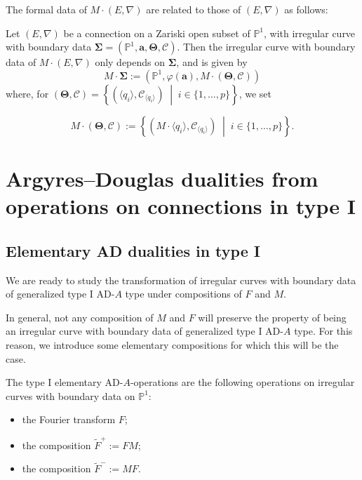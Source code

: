 \documentclass[11pt,a4paper]{amsart}
\numberwithin{equation}{section}
\newcommand{\cir}[1]{\langle #1 \rangle}
\begin{document}
The formal data of $M\cdot (E,\nabla)$ are related to those of $(E,\nabla)$ as follows:

\begin{lemma}
Let $(E,\nabla)$ be a connection on a Zariski open subset of $\mathbb P^1$, with irregular curve with boundary data $\bm\Sigma=(\mathbb P^1, \mathbf a, \bm\Theta, \bm{\mathcal C})$. 
Then the irregular curve with boundary data of $M\cdot (E,\nabla)$ only depends on $\bm\Sigma$, and is given by
\[
M\cdot \bm\Sigma:=(\mathbb P^1, \varphi(\mathbf a), M\cdot(\bm\Theta, \bm{\mathcal C}))
\]
where, for $(\bm\Theta, \bm{\mathcal C})=\left\lbrace \left(\cir{q_i}, \mathcal C_{\cir{q_i}}\right)\;\middle\vert\; i\in \{1, \dots, p\}\right\rbrace$, we set

\[
M\cdot(\bm\Theta, \bm{\mathcal C}):=\left\lbrace\left(M\cdot\cir{q_i}, \mathcal C_{\cir{q_i}}\right)\;\middle\vert\; i\in \{1, \dots, p\}\right\rbrace.
\]
\end{lemma}




\section{Argyres--Douglas dualities from operations on connections in type I}
\label{sec:type_I_dualities}

\subsection{Elementary AD dualities in type I}

We are ready to study the transformation of irregular curves with boundary data of generalized type I AD-$A$ type under compositions of $F$ and $M$. 

In general, not any composition of $M$ and $F$ will preserve the property of being an irregular curve with boundary data of generalized type I AD-$A$ type. For this reason, we introduce some elementary compositions for which this will be the case.

\begin{definition}
The type I elementary AD-$A$-operations are the following operations on irregular curves with boundary data on $\mathbb P^1$:
\begin{itemize}
\item the Fourier transform $F$;
\item the composition $\widetilde F^+:=FM$;
\item the composition $\widetilde F^{-}:=MF$.
\end{itemize}
\end{definition}
\end{document}
